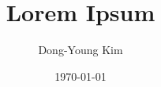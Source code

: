 \documentclass[
  a4paper,
  11pt,
  onecolumn,
  oneside,
  openany,
  chapter,
  tocentry,
  nokorean,
  nounfonts
]{oblivoir}
\title{Lorem Ipsum}
\author{Dong-Young Kim}
\date{\today}
\begin{document}
\frontmatter
  
  \tableofcontents*
  \listoffigures*
  \listoftables*
  

\mainmatter
  
  
  

\backmatter
  \appendix
  
  
  \printindex
\end{document}
